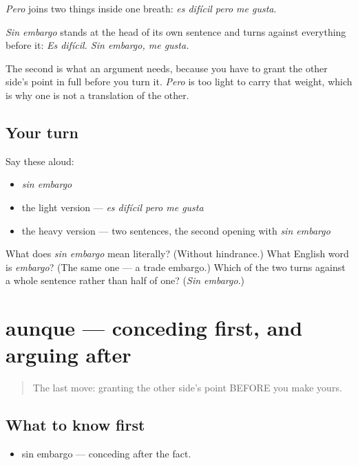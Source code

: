 \begin{grammarlens}[title={What you've built}]
\emph{Pero} joins two things inside one breath: \emph{es difícil pero me gusta}.

\emph{Sin embargo} stands at the head of its own sentence and turns against everything before it: \emph{Es difícil. Sin embargo, me gusta.}

The second is what an argument needs, because you have to grant the other side's point in full before you turn it. \emph{Pero} is too light to carry that weight, which is why one is not a translation of the other.
\end{grammarlens}

\subsection*{Your turn}
Say these aloud:

\begin{itemize}
\raggedright
  \item \emph{sin embargo}
  \item the light version — \emph{es difícil pero me gusta}
  \item the heavy version — two sentences, the second opening with \emph{sin embargo}
\end{itemize}

\begin{tcolorbox}[breakable,colback=teal!4,colframe=teal!35!black,title={Before you move on}]
What does \emph{sin embargo} mean literally? (Without hindrance.) What English word is \emph{embargo}? (The same one — a trade embargo.) Which of the two turns against a whole sentence rather than half of one? (\emph{Sin embargo}.)
\end{tcolorbox}
\section[aunque]{aunque — conceding first, and arguing after}

\label{lesson:ES-C270-aunque}



\begin{quote}
The last move: granting the other side's point BEFORE you make yours.
\end{quote}

\subsection*{What to know first}
\begin{itemize}
\raggedright
  \item sin embargo — conceding after the fact.
\end{itemize}

